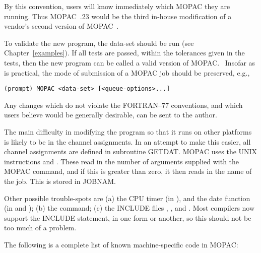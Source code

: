 By this convention, users will know immediately which MOPAC they are running. 
Thus MOPAC~\mopacversion .23 would be the third in-house modification of a
vendor's second version of MOPAC~\mopacversion . 
 
To  validate  the  new  program,  the data-set  should be run
(see Chapter~\ref{examples}). If  all  tests are passed, within the tolerances
given in the tests, then the new program can be called a valid version of
MOPAC. \ Insofar  as is practical, the mode of submission of a MOPAC job should
be preserved, e.g.,

\begin{verbatim}
(prompt) MOPAC <data-set> [<queue-options>...]
\end{verbatim}
 
Any changes which do not violate  the FORTRAN--77  conventions,  and which 
users  believe  would  be  generally desirable, can be sent to the author.

The main difficulty in modifying the program so that it runs on other platforms
is likely to be in the channel assignments.  In an attempt to make this easier,
all channel assignments are defined in subroutine GETDAT.  MOPAC uses the UNIX
instructions  and .  These read in the number of
arguments supplied with the MOPAC command, and if this is greater than zero, it
then reads in the name of the job. This is stored in JOBNAM.

Other possible trouble-spots are (a) the CPU timer (in ), and
the date  function  (in  and ); (b)
the  command; (c) the INCLUDE files ,
, and .  Most compilers now support the INCLUDE
statement, in one form or another, so this should not be too much of a problem.

The following is a complete list of known machine-specific code in MOPAC:

